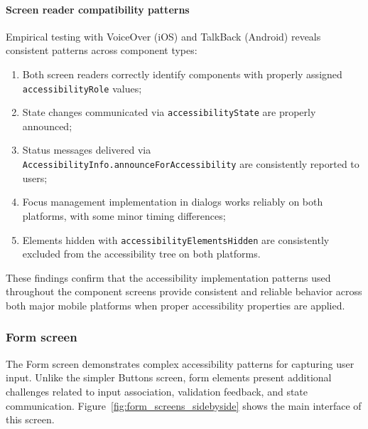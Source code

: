 \paragraph{Screen reader compatibility patterns}

Empirical testing with VoiceOver (iOS) and TalkBack (Android) reveals consistent patterns across component types:

\begin{enumerate}
    \item Both screen readers correctly identify components with properly assigned \\ \texttt{accessibilityRole} values;
    
    \item State changes communicated via \texttt{accessibilityState} are properly announced;
    
    \item Status messages delivered via \texttt{AccessibilityInfo.announceForAccessibility} are consistently reported to users;
    
    \item Focus management implementation in dialogs works reliably on both platforms, with some minor timing differences;
    
    \item Elements hidden with \texttt{accessibilityElementsHidden} are consistently excluded from the accessibility tree on both platforms.
\end{enumerate}

These findings confirm that the accessibility implementation patterns used throughout the component screens provide consistent and reliable behavior across both major mobile platforms when proper accessibility properties are applied.

\subsubsection{Form screen}
\label{subsubsec:forms-screen}

The Form screen demonstrates complex accessibility patterns for capturing user input. Unlike the simpler Buttons screen, form elements present additional challenges related to input association, validation feedback, and state communication. Figure~\ref{fig:form_screens_sidebyside} shows the main interface of this screen.


